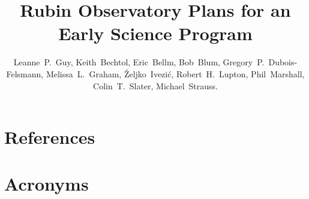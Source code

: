 \documentclass[DM,authoryear,lsstdraft,toc]{lsstdoc}
\title{Rubin Observatory Plans for an Early Science Program}
\author{%
Leanne~P.~Guy, Keith~Bechtol, Eric~Bellm, Bob~Blum, Gregory~P.~Dubois-Felsmann, Melissa~L.~Graham,
\v{Z}eljko~Ivezi\'{c}, Robert~H.~Lupton, Phil~Marshall, Colin~T.~Slater, Michael~Strauss.}
\date{\vcsDate}
\begin{document}
\maketitle










\appendix
\section{References} \label{sec:bib}
\renewcommand{\refname}{} %


\section{Acronyms} \label{sec:acronyms}

\end{document}
